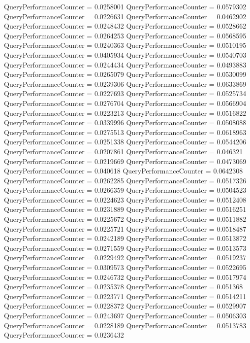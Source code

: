 \documentclass[9pt]{article}
\theoremstyle{plain}
\theoremstyle{definition}
\theoremstyle{remark}
\numberwithin{equation}{section}
\begin{document}
QueryPerformanceCounter  =  0.0258001
QueryPerformanceCounter  =  0.0579302
QueryPerformanceCounter  =  0.0226631
QueryPerformanceCounter  =  0.0462902
QueryPerformanceCounter  =  0.0248432
QueryPerformanceCounter  =  0.0528662
QueryPerformanceCounter  =  0.0264253
QueryPerformanceCounter  =  0.0568595
QueryPerformanceCounter  =  0.0240363
QueryPerformanceCounter  =  0.0510195
QueryPerformanceCounter  =  0.0405934
QueryPerformanceCounter  =  0.0540703
QueryPerformanceCounter  =  0.0244434
QueryPerformanceCounter  =  0.0493883
QueryPerformanceCounter  =  0.0265079
QueryPerformanceCounter  =  0.0530099
QueryPerformanceCounter  =  0.0239306
QueryPerformanceCounter  =  0.0633869
QueryPerformanceCounter  =  0.0227693
QueryPerformanceCounter  =  0.0525734
QueryPerformanceCounter  =  0.0276704
QueryPerformanceCounter  =  0.0566904
QueryPerformanceCounter  =  0.0223213
QueryPerformanceCounter  =  0.0516822
QueryPerformanceCounter  =  0.0339996
QueryPerformanceCounter  =  0.0508088
QueryPerformanceCounter  =  0.0275513
QueryPerformanceCounter  =  0.0618963
QueryPerformanceCounter  =  0.0251338
QueryPerformanceCounter  =  0.0544206
QueryPerformanceCounter  =  0.0207861
QueryPerformanceCounter  =  0.046321
QueryPerformanceCounter  =  0.0219669
QueryPerformanceCounter  =  0.0473069
QueryPerformanceCounter  =  0.040618
QueryPerformanceCounter  =  0.0642308
QueryPerformanceCounter  =  0.0262285
QueryPerformanceCounter  =  0.0517326
QueryPerformanceCounter  =  0.0266359
QueryPerformanceCounter  =  0.0504523
QueryPerformanceCounter  =  0.0224623
QueryPerformanceCounter  =  0.0512408
QueryPerformanceCounter  =  0.0231889
QueryPerformanceCounter  =  0.0516251
QueryPerformanceCounter  =  0.0225672
QueryPerformanceCounter  =  0.0511882
QueryPerformanceCounter  =  0.0225721
QueryPerformanceCounter  =  0.0518487
QueryPerformanceCounter  =  0.0242189
QueryPerformanceCounter  =  0.0513872
QueryPerformanceCounter  =  0.0271559
QueryPerformanceCounter  =  0.0513573
QueryPerformanceCounter  =  0.0229492
QueryPerformanceCounter  =  0.0519237
QueryPerformanceCounter  =  0.0309573
QueryPerformanceCounter  =  0.0522695
QueryPerformanceCounter  =  0.0246732
QueryPerformanceCounter  =  0.0517974
QueryPerformanceCounter  =  0.0235378
QueryPerformanceCounter  =  0.051368
QueryPerformanceCounter  =  0.0223771
QueryPerformanceCounter  =  0.0514211
QueryPerformanceCounter  =  0.0228372
QueryPerformanceCounter  =  0.0529907
QueryPerformanceCounter  =  0.0243697
QueryPerformanceCounter  =  0.0506303
QueryPerformanceCounter  =  0.0228189
QueryPerformanceCounter  =  0.0513783
QueryPerformanceCounter  =  0.0236432
\end{document}

